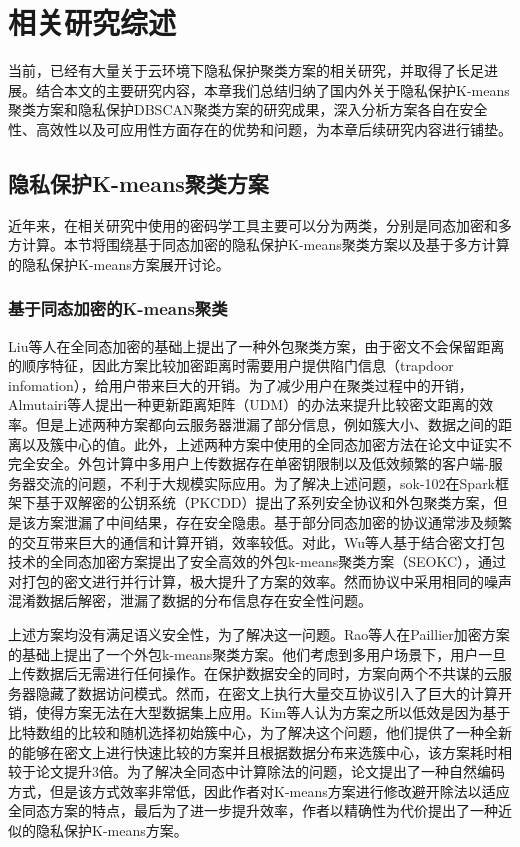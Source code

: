 \chapter{相关研究综述}
当前，已经有大量关于云环境下隐私保护聚类方案的相关研究，并取得了长足进展。结合本文的主要研究内容，本章我们总结归纳了国内外关于隐私保护K-means聚类方案和隐私保护DBSCAN聚类方案的研究成果，深入分析方案各自在安全性、高效性以及可应用性方面存在的优势和问题，为本章后续研究内容进行铺垫。

\section{隐私保护K-means聚类方案}
近年来，在相关研究中使用的密码学工具主要可以分为两类，分别是同态加密和多方计算。本节将围绕基于同态加密的隐私保护K-means聚类方案以及基于多方计算的隐私保护K-means方案展开讨论。
\subsection{基于同态加密的K-means聚类}
Liu\cite{liu2014privacy}等人在全同态加密的基础上提出了一种外包聚类方案，由于密文不会保留距离的顺序特征，因此方案比较加密距离时需要用户提供陷门信息（trapdoor infomation），给用户带来巨大的开销。为了减少用户在聚类过程中的开销，Almutairi\cite{almutairi2017k}等人提出一种更新距离矩阵（UDM）的办法来提升比较密文距离的效率。但是上述两种方案都向云服务器泄漏了部分信息，例如簇大小、数据之间的距离以及簇中心的值。此外，上述两种方案中使用的全同态加密方法在论文\cite{wang2015notes}中证实不完全安全。外包计算中多用户上传数据存在单密钥限制以及低效频繁的客户端-服务器交流的问题，不利于大规模实际应用。为了解决上述问题，sok-102在Spark框架下基于双解密的公钥系统（PKCDD）提出了系列安全协议和外包聚类方案，但是该方案泄漏了中间结果，存在安全隐患。基于部分同态加密的协议通常涉及频繁的交互带来巨大的通信和计算开销，效率较低。对此，Wu等人\cite{wu2020secure}基于结合密文打包技术的全同态加密方案提出了安全高效的外包k-means聚类方案（SEOKC），通过对打包的密文进行并行计算，极大提升了方案的效率。然而协议中采用相同的噪声混淆数据后解密，泄漏了数据的分布信息存在安全性问题。

上述方案均没有满足语义安全性，为了解决这一问题。Rao等人\cite{rao2015privacy}在Paillier加密方案的基础上提出了一个外包k-means聚类方案。他们考虑到多用户场景下，用户一旦上传数据后无需进行任何操作。在保护数据安全的同时，方案向两个不共谋的云服务器隐藏了数据访问模式。然而，在密文上执行大量交互协议引入了巨大的计算开销，使得方案无法在大型数据集上应用。Kim等\cite{kim2018privacy}人认为方案\cite{rao2015privacy}之所以低效是因为基于比特数组的比较和随机选择初始簇中心，为了解决这个问题，他们提供了一种全新的能够在密文上进行快速比较的方案并且根据数据分布来选簇中心，该方案耗时相较于论文\cite{rao2015privacy}提升3倍。为了解决全同态中计算除法的问题，论文\cite{jaschke2019unsupervised}提出了一种自然编码方式，但是该方式效率非常低，因此作者对K-means方案进行修改避开除法以适应全同态方案的特点，最后为了进一步提升效率，作者以精确性为代价提出了一种近似的隐私保护K-means方案。
